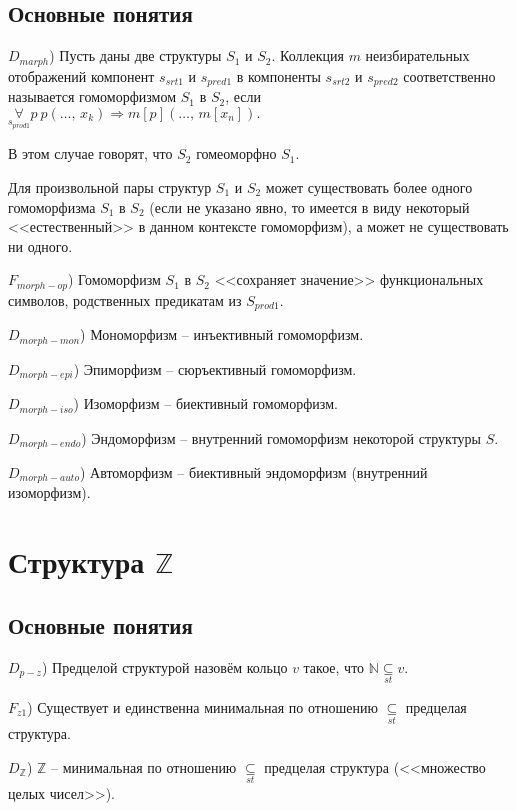 \documentclass[a4paper]{article}
\begin{document}
\subsection{Основные понятия}

$D_{marph}$) Пусть даны две структуры $S_1$ и $S_2$. Коллекция $m$ неизбирательных отображений компонент $s_{srt1}$ и $s_{pred1}$ в компоненты $s_{srt2}$ и $s_{pred2}$ соответственно называется гомоморфизмом $S_1$ в $S_2$, если $\underset{s_{prod1}}{\forall} p~p(\dots, \, x_k) \Rightarrow m[p] (\dots, \, m[x_n]).$

В этом случае говорят, что $S_2$ гомеоморфно $S_1$.

Для произвольной пары структур $S_1$ и $S_2$ может существовать более одного гомоморфизма $S_1$ в $S_2$ (если не указано явно, то имеется в виду некоторый <<естественный>> в данном контексте гомоморфизм), а может не существовать ни одного.

$F_{morph-op}$) Гомоморфизм $S_1$ в $S_2$ <<сохраняет значение>> функциональных символов, родственных предикатам из $S_{prod1}$.

$D_{morph-mon}$) Мономорфизм -- инъективный гомоморфизм.

$D_{morph-epi}$) Эпиморфизм -- сюръективный гомоморфизм.

$D_{morph-iso}$) Изоморфизм -- биективный гомоморфизм.

$D_{morph-endo}$) Эндоморфизм -- внутренний гомоморфизм некоторой структуры $S$.

$D_{morph-auto}$) Автоморфизм -- биективный эндоморфизм (внутренний изоморфизм).


\section{Структура $\mathbb{Z}$}

\subsection{Основные понятия}

$D_{p-z}$) Предцелой структурой назовём кольцо $v$ такое, что $\mathbb{N} \underset{st}{\subseteq} v$.

$F_{z1}$) Существует и единственна минимальная по отношению $\underset{st}{\subseteq}$ предцелая структура.

$D_{\mathbb{Z}}$) $\mathbb{Z}$ -- минимальная по отношению $\underset{st}{\subseteq}$ предцелая структура (<<множество целых чисел>>).
\end{document}
